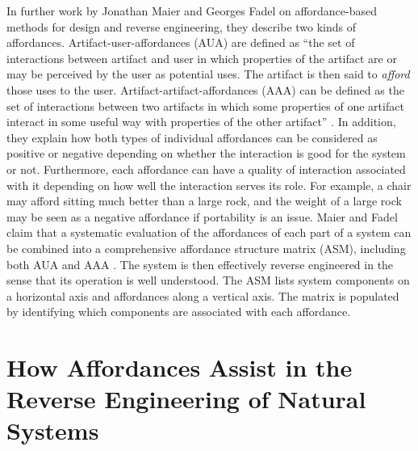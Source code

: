In further work by Jonathan Maier and Georges Fadel on affordance-based
methods for design and reverse engineering, they describe two kinds of
affordances. Artifact-user-affordances (AUA) are defined as “the set of
interactions between artifact and user in which properties of the
artifact are or may be perceived by the user as potential uses. The
artifact is then said to \textit{afford} those uses to the user. 
Artifact-artifact-affordances (AAA) can be defined as the set of
interactions between two artifacts in which some properties of one
artifact interact in some useful way with properties of the other
artifact” \citep{maierfadel2003}. In addition, they explain how both types %
of individual affordances can be considered as positive or negative
depending on whether the interaction is good for the system or not.
Furthermore, each affordance can have a quality of interaction
associated with it depending on how well the interaction serves its
role. For example, a chair may afford sitting much better than a large
rock, and the weight of a large rock may be seen as a negative
affordance if portability is an issue. Maier and Fadel claim that a
systematic evaluation of the affordances of each part of a system can
be combined into a comprehensive affordance structure matrix (ASM),
including both AUA and AAA . The system is then
effectively reverse engineered in the sense that its operation is well
understood. The ASM lists system components on a horizontal axis and
affordances along a vertical axis. The matrix is populated by
identifying which components are associated with each affordance.

\section{How Affordances Assist in the Reverse Engineering of Natural Systems}

